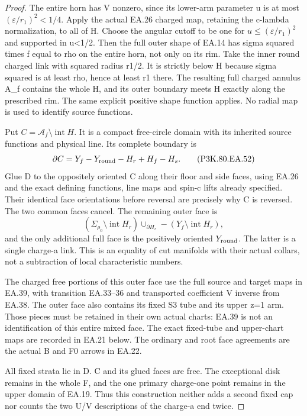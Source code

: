 \begin{proof}
The entire horn has V nonzero, since its lower-arm parameter
u is at most \((\varepsilon/r_1)^2<1/4\). Apply the actual
EA.26 charged map, retaining the c-lambda normalization, to all
of H. Choose the angular cutoff to be one for
\(u\le(\varepsilon/r_1)^2\) and supported in u<1/2.
Then the full outer shape of EA.14 has sigma squared times f
equal to rho on the entire horn, not only on its rim. Take the
inner round charged link with squared radius r1/2. It is
strictly below H because sigma squared is at least rho, hence
at least r1 there.
The resulting full charged annulus A\_f contains the whole H,
and its outer boundary meets H exactly along the prescribed
rim. The same explicit positive shape function applies.
No radial map is used to identify source functions.

Put \(C=\mathcal A_f\setminus\operatorname{int}H\).
It is a compact free-circle domain with its inherited source
functions and physical line. Its complete boundary is
\[
           \partial C=Y_f-Y_{\rm round}-H_r+H_f-H_s.
 \tag{P3K.80.EA.52}
\]
Glue D to the oppositely oriented C along their floor and side
faces, using EA.26 and the exact defining functions, line maps
and spin-c lifts already specified. Their identical face
orientations before reversal are precisely why C is reversed.
The two common faces cancel. The remaining outer face is
\[
 (\Sigma_{\rho_0}\setminus\operatorname{int}H_r)
       \cup_{\partial H_r}
       -(Y_f\setminus\operatorname{int}H_r),
\]
and the only additional full face is the positively oriented
\(Y_{\rm round}\). The latter is a single charge-a link.
This is an equality of cut manifolds with their actual collars,
not a subtraction of local characteristic numbers.

The charged free portions of this outer face use the full
source and target maps in EA.39, with transition EA.33--36
and transported coefficient V inverse from EA.38. The outer
face also contains its fixed S3 tube and its upper z=1 arm.
Those pieces must be retained in their own actual charts:
EA.39 is not an identification of this entire mixed face.
The exact fixed-tube and upper-chart maps are recorded in
EA.21 below. The ordinary and root face agreements are the actual B and F0 arrows in EA.22.

All fixed strata lie in D. C and its glued faces are free.
The exceptional disk remains in the whole F, and the one
primary charge-one point remains in the upper domain of EA.19.
Thus this construction neither adds a second fixed cap nor
counts the two U/V descriptions of the charge-a end twice.


\end{proof}
